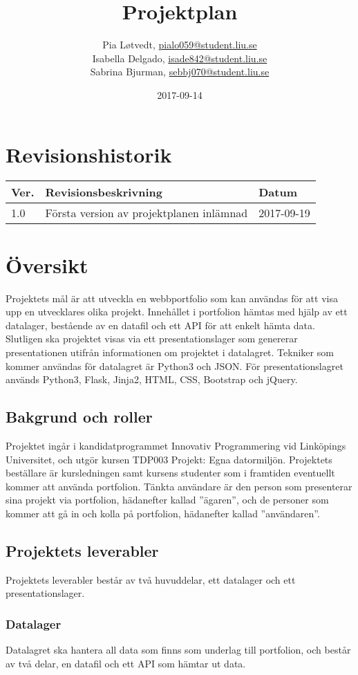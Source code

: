 \documentclass{TDP003mall}
\author{Pia Løtvedt, \url{pialo059@student.liu.se}\\
  Isabella Delgado, \url{isade842@student.liu.se}\\
Sabrina Bjurman, \url{sebbj070@student.liu.se}}
\title{Projektplan}
\date{2017-09-14}
\begin{document}
\projectpage

\tableofcontents
\pagebreak

\section{Revisionshistorik}
\begin{table}[!h]
\renewcommand{\arraystretch}{1.5}
\begin{tabularx}{\linewidth}{|l|X|l|}
\hline
Ver. & Revisionsbeskrivning & Datum \\
\hline
1.0 & Första version av projektplanen inlämnad & 2017-09-19 \\
\hline
\end{tabularx}
\end{table}

\section{Översikt}
Projektets mål är att utveckla en webbportfolio som kan användas för att visa upp en utvecklares olika projekt. Innehållet i portfolion hämtas med hjälp av ett datalager, bestående av en datafil och ett API för att enkelt hämta data. Slutligen ska projektet visas via ett presentationslager som genererar presentationen utifrån informationen om projektet i datalagret. Tekniker som kommer användas för datalagret är Python3 och JSON. För presentationslagret används Python3, Flask, Jinja2, HTML, CSS, Bootstrap och jQuery.

\subsection{Bakgrund och roller}
Projektet ingår i kandidatprogrammet Innovativ Programmering vid Linköpings Universitet, och utgör kursen TDP003 Projekt: Egna datormiljön. Projektets beställare är kursledningen samt kursens studenter som i framtiden eventuellt kommer att använda portfolion. Tänkta användare är den person som presenterar sina projekt via portfolion, hädanefter kallad ''ägaren'', och de personer som kommer att gå in och kolla på portfolion, hädanefter kallad ''användaren''.

\subsection{Projektets leverabler}
Projektets leverabler består av två huvuddelar, ett datalager och ett presentationslager.

\subsubsection{Datalager}
Datalagret ska hantera all data som finns som underlag till portfolion, och består av två delar, en datafil och ett API som hämtar ut data.
\end{document}

